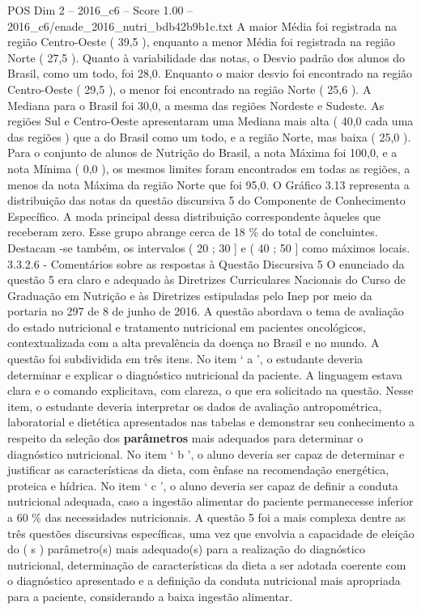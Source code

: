\begin{textsample}{POS Dim 2 – 2016\_c6 – Score 1.00 – 2016\_c6/enade\_2016\_nutri\_bdb42b9b1c.txt}
A maior Média foi registrada na região Centro-Oeste ( 39,5 ), enquanto a menor Média foi registrada na região Norte ( 27,5 ).
Quanto à variabilidade das notas, o Desvio padrão dos alunos do Brasil, como um todo, foi 28,0.
Enquanto o maior desvio foi encontrado na região Centro-Oeste ( 29,5 ), o menor foi encontrado na região Norte ( 25,6 ).
A Mediana para o Brasil foi 30,0, a mesma das regiões Nordeste e Sudeste.
As regiões Sul e Centro-Oeste apresentaram uma Mediana mais alta ( 40,0 cada uma das regiões ) que a do Brasil como um todo, e a região Norte, mas baixa ( 25,0 ).
Para o conjunto de alunos de Nutrição do Brasil, a nota Máxima foi 100,0, e a nota Mínima ( 0,0 ), os mesmos limites foram encontrados em todas as regiões, a menos da nota Máxima da região Norte que foi 95,0.
O Gráfico 3.13 representa a distribuição das notas da questão discursiva 5 do Componente de Conhecimento Específico.
A moda principal dessa distribuição correspondente àqueles que receberam zero.
Esse grupo abrange cerca de 18 \% do total de concluintes.
Destacam -se também, os intervalos ( 20 ; 30 ] e ( 40 ; 50 ] como máximos locais. 3.3.2.6 - Comentários sobre as respostas à Questão Discursiva 5 O enunciado da questão 5 era claro e adequado às Diretrizes Curriculares Nacionais do Curso de Graduação em Nutrição e às Diretrizes estipuladas pelo Inep por meio da portaria no 297 de 8 de junho de 2016.
A questão abordava o tema de avaliação do estado nutricional e tratamento nutricional em pacientes oncológicos, contextualizada com a alta prevalência da doença no Brasil e no mundo.
A questão foi subdividida em três itens.
No item ‘ a ’, o estudante deveria determinar e explicar o diagnóstico nutricional da paciente.
A linguagem estava clara e o comando explicitava, com clareza, o que era solicitado na questão.
Nesse item, o estudante deveria interpretar os dados de avaliação antropométrica, laboratorial e dietética apresentados nas tabelas e demonstrar seu conhecimento a respeito da seleção dos \textbf{parâmetros} mais adequados para determinar o diagnóstico nutricional.
No item ‘ b ’, o aluno deveria ser capaz de determinar e justificar as características da dieta, com ênfase na recomendação energética, proteica e hídrica.
No item ‘ c ’, o aluno deveria ser capaz de definir a conduta nutricional adequada, caso a ingestão alimentar do paciente permanecesse inferior a 60 \% das necessidades nutricionais.
A questão 5 foi a mais complexa dentre as três questões discursivas específicas, uma vez que envolvia a capacidade de eleição do ( s ) parâmetro(s) mais adequado(s) para a realização do diagnóstico nutricional, determinação de características da dieta a ser adotada coerente com o diagnóstico apresentado e a definição da conduta nutricional mais apropriada para a paciente, considerando a baixa ingestão alimentar.

\end{textsample}
